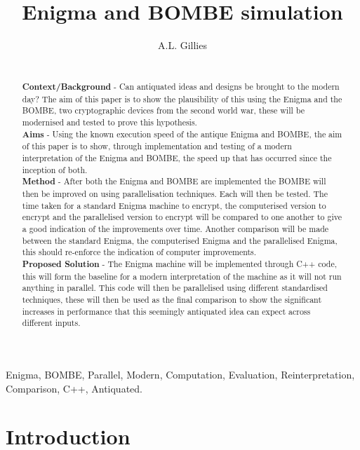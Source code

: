 \documentclass[12pt,a4paper]{article}
\title{Enigma and BOMBE simulation}
\author{A.L. Gillies}
\date{}
\begin{document}
\maketitle

\begin{abstract}\\

{\bf Context/Background} - Can antiquated ideas and designs be brought to the modern day? The aim of this paper is to show the plausibility of this using the Enigma and the BOMBE, two cryptographic devices from the second world war, these will be modernised and tested to prove this hypothesis.\\

{\bf Aims} - Using the known execution speed of the antique Enigma and BOMBE, the aim of this paper is to show, through implementation and testing of a modern interpretation of the Enigma and BOMBE, the speed up that has occurred since the inception of both.\\

{\bf Method} - After both the Enigma and BOMBE are implemented the BOMBE will then be improved on using parallelisation techniques. Each will then be tested. The time taken for a standard Enigma machine to encrypt, the computerised version to encrypt and the parallelised version to encrypt will be compared to one another to give a good indication of the improvements over time. Another comparison will be made between the standard Enigma, the computerised Enigma and the parallelised Enigma, this should re-enforce the indication of computer improvements.\\

{\bf Proposed Solution} - The Enigma machine will be implemented through C++ code, this will form the baseline for a modern interpretation of the machine as it will not run anything in parallel. This code will then be parallelised using different standardised techniques, these will then be used as the final comparison to show the significant increases in performance that this seemingly antiquated idea can expect across different inputs.\\
\end{abstract}

\begin{keywords}
Enigma, BOMBE, Parallel, Modern, Computation, Evaluation, Reinterpretation, Comparison, C++, Antiquated.
\end{keywords}



\section{Introduction}
\end{document}
